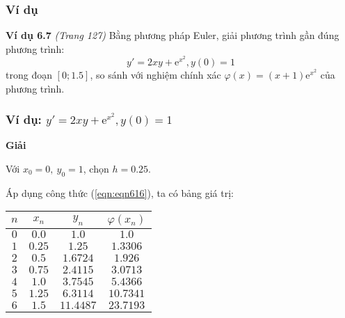 \begin{frame}
	\frametitle{Ví dụ}
	\textbf{Ví dụ 6.7} \textit{(Trang 127)} Bằng phương pháp Euler, giải phương trình gần đúng phương trình:
	$$y'=2xy+\mathrm{e}^{x^2},y(0)=1$$
	trong đoạn $[0;1.5]$, so sánh với nghiệm chính xác $\varphi(x)=(x+1)\mathrm{e}^{x^2}$ của phương trình.\par
\end{frame}
\begin{frame}
	\frametitle{Ví dụ: $y'=2xy+\mathrm{e}^{x^2},y(0)=1$}
	\textbf{Giải}\par
	Với $x_0=0,~y_0=1$, chọn $h=0.25$.\par
	Áp dụng công thức (\ref{eqn:eqn616}), ta có bảng giá trị:
	\begin{table}\begin{tabular}{|c|c|c|c|}\hline
		$n$ & $x_n$  & $y_n$     & $\varphi(x_n)$ \\\hline
		$0$ & $0.0$  & $1.0$     & $1.0$     \\\hline
		$1$ & $0.25$ & $1.25$    & $1.3306$  \\\hline
		$2$ & $0.5$  & $1.6724$  & $1.926$   \\\hline
		$3$ & $0.75$ & $2.4115$  & $3.0713$  \\\hline
		$4$ & $1.0$  & $3.7545$  & $5.4366$  \\\hline
		$5$ & $1.25$ & $6.3114$  & $10.7341$ \\\hline
		$6$ & $1.5$  & $11.4487$ & $23.7193$ \\\hline
	\end{tabular}\end{table}
\end{frame}
